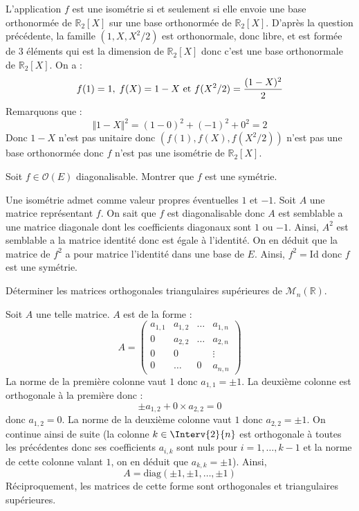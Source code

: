 \documentclass[a4paper,10pt]{report}
\begin{document}
\begin{corr}
\begin{enumerate}
\medskip

\noindent L'application $f$ est une isométrie si et seulement si elle envoie une base orthonormée de $\mathbb{R}_2[X]$ sur une base orthonormée de $\mathbb{R}_2[X]$. D'après la question précédente, la famille $(1,X,X^2/2)$ est orthonormale, donc libre, et est formée de $3$ éléments qui est la dimension de $\mathbb{R}_2[X]$ donc c'est une base orthonormale de $\mathbb{R}_2[X]$. On a :
$$ f(1)=1, \; f(X)=1-X \hbox{ et } f(X^2/2) = \dfrac{(1-X)^2}{2}$$
Remarquons que :
$$ \Vert 1-X \Vert^2 = (1-0)^2 + (-1)^2+ 0^2 = 2$$
Donc $1-X$ n'est pas unitaire donc $(f(1),f(X), f(X^2/2))$ n'est pas une base orthonormée donc $f$ n'est pas une isométrie de  $\mathbb{R}_2[X]$.
\end{enumerate}
\end{corr}

\begin{Exa} Soit $f \in \mathcal{O}(E)$ diagonalisable. Montrer que $f$ est une symétrie.
\end{Exa} 

\corr Une isométrie admet comme valeur propres éventuelles $1$ et $-1$. Soit $A$ une matrice représentant $f$. On sait que $f$ est diagonalisable donc $A$ est semblable a une matrice diagonale dont les coefficients diagonaux sont $1$ ou $-1$. Ainsi, $A^2$ est semblable a la matrice identité donc est égale à l'identité. On en déduit que la matrice de $f^2$ a pour matrice l'identité dans une base de $E$. Ainsi, $f^2= \textrm{Id}$ donc $f$ est une symétrie.

\begin{Exa} Déterminer les matrices orthogonales triangulaires supérieures de $\mathcal{M}_n(\mathbb{R})$.
\end{Exa}

\corr Soit $A$ une telle matrice. $A$ est de la forme :
$$ A = \begin{pmatrix}
a_{1,1} & a_{1,2} & \ldots & a_{1,n} \\
0 & a_{2,2} & \ldots & a_{2,n} \\
0 & 0 & & \vdots \\
0 & \ldots & 0 & a_{n,n} \end{pmatrix}$$
La norme de la première colonne vaut $1$ donc $a_{1,1} = \pm 1$. La deuxième colonne est orthogonale à la première donc :
$$ \pm a_{1,2} + 0 \times a_{2,2} = 0$$
donc $a_{1,2}=0$. La norme de la deuxième colonne vaut $1$ donc $a_{2,2} = \pm 1$. On continue ainsi de suite (la colonne $k \in \Interv{2}{n}$ est orthogonale à toutes les précédentes donc ses coefficients $a_{i,k}$ sont nuls pour $i=1, \ldots, k-1$ et la norme de cette colonne valant $1$, on en déduit que $a_{k,k}= \pm 1$). Ainsi,
$$ A= \textrm{diag}(\pm 1, \pm 1, \ldots, \pm 1)$$
Réciproquement, les matrices de cette forme sont orthogonales et triangulaires supérieures.
\end{document}
